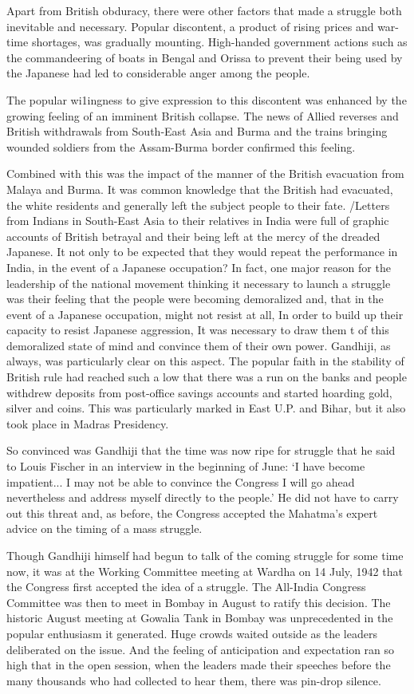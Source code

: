Apart from British obduracy, there were other factors that made a struggle both inevitable and necessary. Popular discontent, a product of rising prices and war-time shortages, was gradually mounting. High-handed government actions such as the commandeering of boats in Bengal and Orissa to prevent their being used by the Japanese had led to considerable anger among the people.

The popular wi1ingness to give expression to this discontent was enhanced by the growing feeling of an imminent British collapse. The news of Allied reverses and British withdrawals from South-East Asia and Burma and the trains bringing wounded soldiers from the Assam-Burma border confirmed this feeling.

Combined with this was the impact of the manner of the British evacuation from Malaya and Burma. It was common knowledge that the British had evacuated, the white residents and generally left the subject people to their fate. /Letters from Indians in South-East Asia to their relatives in India were full of graphic accounts of British betrayal and their being left at the mercy of the dreaded Japanese. It not only to be expected that they would repeat the performance in India, in the event of a Japanese occupation? In fact, one major reason for the leadership of the national movement thinking it necessary to launch a struggle was their feeling that the people were becoming demoralized and, that in the event of a Japanese occupation, might not resist at all, In order to build up their capacity to resist Japanese aggression, It was necessary to draw them t of this demoralized state of mind and convince them of their own power. Gandhiji, as always, was particularly clear on this aspect. The popular faith in the stability of British rule had reached such a low that there was a run on the banks and people withdrew deposits from post-office savings accounts and started hoarding gold, silver and coins. This was particularly marked in East U.P. and Bihar, but it also took place in Madras Presidency.

So convinced was Gandhiji that the time was now ripe for struggle that he said to Louis Fischer in an interview in the beginning of June: `I have become impatient... I may not be able to convince the Congress I will go ahead nevertheless and address myself directly to the people.' He did not have to carry out this threat and, as before, the Congress accepted the Mahatma's expert advice on the timing of a mass struggle.

Though Gandhiji himself had begun to talk of the coming struggle for some time now, it was at the Working Committee meeting at Wardha on 14 July, 1942 that the Congress first accepted the idea of a struggle. The All-India Congress Committee was then to meet in Bombay in August to ratify this decision. The historic August meeting at Gowalia Tank in Bombay was unprecedented in the popular enthusiasm it generated. Huge crowds waited outside as the leaders deliberated on the issue. And the feeling of anticipation and expectation ran so high that in the open session, when the leaders made their speeches before the many thousands who had collected to hear them, there was pin-drop silence.

